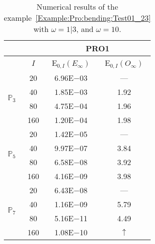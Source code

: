 \begin{table}[H]
\caption{Numerical results of the example~\ref{Example:Pro:bending:Test01_23} with $\omega=1|3$, and $\omega=10$.}
\setlength{\tabcolsep}{5pt}
\centering
\begin{tabular}{@{}l c c c@{}}
\toprule
 &  & \multicolumn{2}{c}{PRO1}\\
\midrule
 & $I$ & E$_{0,I}(E_{\infty})$ & E$_{0,I}(O_{\infty})$\\
\midrule
\multirow{4}{*}{$\mathbb{P}_{3}$} & 20 & 6.96E$-$03 & ---\\
 & 40 & 1.85E$-$03 & 1.92\\
 & 80 & 4.75E$-$04 & 1.96\\
 & 160 & 1.20E$-$04 & 1.98\\
\midrule
\multirow{4}{*}{$\mathbb{P}_{5}$} & 20 & 1.42E$-$05 & ---\\
 & 40 & 9.97E$-$07 & 3.84\\
 & 80 & 6.58E$-$08 & 3.92\\
 & 160 & 4.16E$-$09 & 3.98\\
\midrule
\multirow{4}{*}{$\mathbb{P}_{7}$} & 20 & 6.43E$-$08 & ---\\
 & 40 & 1.16E$-$09 & 5.79\\
 & 80 & 5.16E$-$11 & 4.49\\
 & 160 & 1.08E$-$10 & $\uparrow$\\
\bottomrule
\end{tabular}
\label{Table:PRO:test_01_23_test8}
\end{table}
